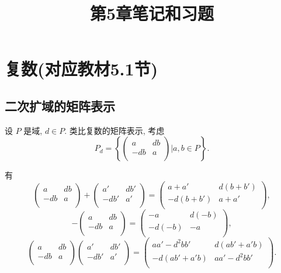 \documentclass[color=black,device=normal,lang=cn,mode=geye]{elegantnote}
\title{第5章笔记和习题}
\begin{document}
\maketitle
\section{复数(对应教材5.1节)}
\subsection{二次扩域的矩阵表示}
设 $P$ 是域, $d\in P$. 类比复数的矩阵表示, 考虑
\[P_d=\left\{\begin{pmatrix}
    a & db \\
    -db & a \\
\end{pmatrix}\Bigg|a,b\in P\right\}.\]

有
\[\begin{pmatrix}
    a & db \\
    -db & a \\
\end{pmatrix}+\begin{pmatrix}
    a' & db' \\
    -db' & a' \\
\end{pmatrix}=\begin{pmatrix}
    a+a' & d(b+b') \\
    -d(b+b') & a+a' \\
\end{pmatrix},\]
\[-\begin{pmatrix}
    a & db \\
    -db & a \\
\end{pmatrix}=\begin{pmatrix}
    -a & d(-b) \\
    -d(-b) & -a \\
\end{pmatrix},\]
\[\begin{pmatrix}
    a & db \\
    -db & a \\
\end{pmatrix}\begin{pmatrix}
    a' & db' \\
    -db' & a' \\
\end{pmatrix}=\begin{pmatrix}
    aa'-d^2bb' & d(ab'+a'b) \\
    -d(ab'+a'b) & aa'-d^2bb' \\
\end{pmatrix}.\]
\end{document}
